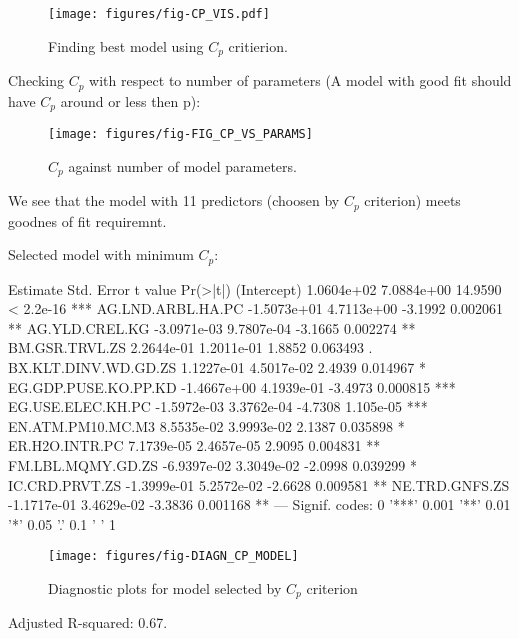 \documentclass[a4paper]{article}
\begin{document}
\begin{figure}[H]
\begin{center}
\advance\rightskip-0.5cm
\advance\leftskip-1cm
\texttt{[image: figures/fig-CP\_VIS.pdf]}
\caption{Finding best model using $C_p$ critierion.}
\end{center}
\end{figure}

Checking $C_p$ with respect to number of parameters (A model with good fit
should have $C_p$ around or less then p):
\begin{figure}[H]
\begin{center}
\texttt{[image: figures/fig-FIG\_CP\_VS\_PARAMS]}
\caption{$C_p$ against number of model parameters.}
\end{center}
\end{figure}
We see that the model with 11 predictors (choosen by $C_p$ criterion) meets
goodnes of fit requiremnt.

Selected model with minimum $C_p$:
\begin{Schunk}
\begin{Soutput}
                        Estimate  Std. Error t value  Pr(>|t|)    
(Intercept)           1.0604e+02  7.0884e+00 14.9590 < 2.2e-16 ***
AG.LND.ARBL.HA.PC    -1.5073e+01  4.7113e+00 -3.1992  0.002061 ** 
AG.YLD.CREL.KG       -3.0971e-03  9.7807e-04 -3.1665  0.002274 ** 
BM.GSR.TRVL.ZS        2.2644e-01  1.2011e-01  1.8852  0.063493 .  
BX.KLT.DINV.WD.GD.ZS  1.1227e-01  4.5017e-02  2.4939  0.014967 *  
EG.GDP.PUSE.KO.PP.KD -1.4667e+00  4.1939e-01 -3.4973  0.000815 ***
EG.USE.ELEC.KH.PC    -1.5972e-03  3.3762e-04 -4.7308 1.105e-05 ***
EN.ATM.PM10.MC.M3     8.5535e-02  3.9993e-02  2.1387  0.035898 *  
ER.H2O.INTR.PC        7.1739e-05  2.4657e-05  2.9095  0.004831 ** 
FM.LBL.MQMY.GD.ZS    -6.9397e-02  3.3049e-02 -2.0998  0.039299 *  
IC.CRD.PRVT.ZS       -1.3999e-01  5.2572e-02 -2.6628  0.009581 ** 
NE.TRD.GNFS.ZS       -1.1717e-01  3.4629e-02 -3.3836  0.001168 ** 
---
Signif. codes:  0 '***' 0.001 '**' 0.01 '*' 0.05 '.' 0.1 ' ' 1
\end{Soutput}
\end{Schunk}

\begin{figure}[H]
\begin{center}
\texttt{[image: figures/fig-DIAGN\_CP\_MODEL]}
\caption{Diagnostic plots for model selected by $C_p$ criterion}
\end{center}
\end{figure}
Adjusted R-squared:
0.67.
\end{document}

